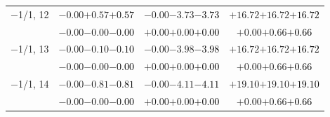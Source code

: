 \documentclass[compress]{beamer}
\begin{document}
\begin{frame}
\begin{tabular}{r | c | c | c}
$-$1/1, 12 & $-0.00$\hspace{0.1 cm}$+0.57$\hspace{0.1 cm}\textcolor{black}{$+0.57$} & $-0.00$\hspace{0.1 cm}$-3.73$\hspace{0.1 cm}\textcolor{black}{$-3.73$} & $+16.72$\hspace{0.1 cm}$+16.72$\hspace{0.1 cm}\textcolor{black}{$+16.72$} \\
           & $-0.00$\hspace{0.1 cm}$-0.00$\hspace{0.1 cm}\textcolor{black}{$-0.00$} & $+0.00$\hspace{0.1 cm}$+0.00$\hspace{0.1 cm}\textcolor{black}{$+0.00$} & $+0.00$\hspace{0.1 cm}$+0.66$\hspace{0.1 cm}\textcolor{black}{$+0.66$} \\
$-$1/1, 13 & $-0.00$\hspace{0.1 cm}$-0.10$\hspace{0.1 cm}\textcolor{black}{$-0.10$} & $-0.00$\hspace{0.1 cm}$-3.98$\hspace{0.1 cm}\textcolor{black}{$-3.98$} & $+16.72$\hspace{0.1 cm}$+16.72$\hspace{0.1 cm}\textcolor{black}{$+16.72$} \\
           & $-0.00$\hspace{0.1 cm}$-0.00$\hspace{0.1 cm}\textcolor{black}{$-0.00$} & $+0.00$\hspace{0.1 cm}$+0.00$\hspace{0.1 cm}\textcolor{black}{$+0.00$} & $+0.00$\hspace{0.1 cm}$+0.66$\hspace{0.1 cm}\textcolor{black}{$+0.66$} \\
$-$1/1, 14 & $-0.00$\hspace{0.1 cm}$-0.81$\hspace{0.1 cm}\textcolor{black}{$-0.81$} & $-0.00$\hspace{0.1 cm}$-4.11$\hspace{0.1 cm}\textcolor{black}{$-4.11$} & $+19.10$\hspace{0.1 cm}$+19.10$\hspace{0.1 cm}\textcolor{black}{$+19.10$} \\
           & $-0.00$\hspace{0.1 cm}$-0.00$\hspace{0.1 cm}\textcolor{black}{$-0.00$} & $+0.00$\hspace{0.1 cm}$+0.00$\hspace{0.1 cm}\textcolor{black}{$+0.00$} & $+0.00$\hspace{0.1 cm}$+0.66$\hspace{0.1 cm}\textcolor{black}{$+0.66$} \\

\end{tabular}
\end{frame}
\end{document}
